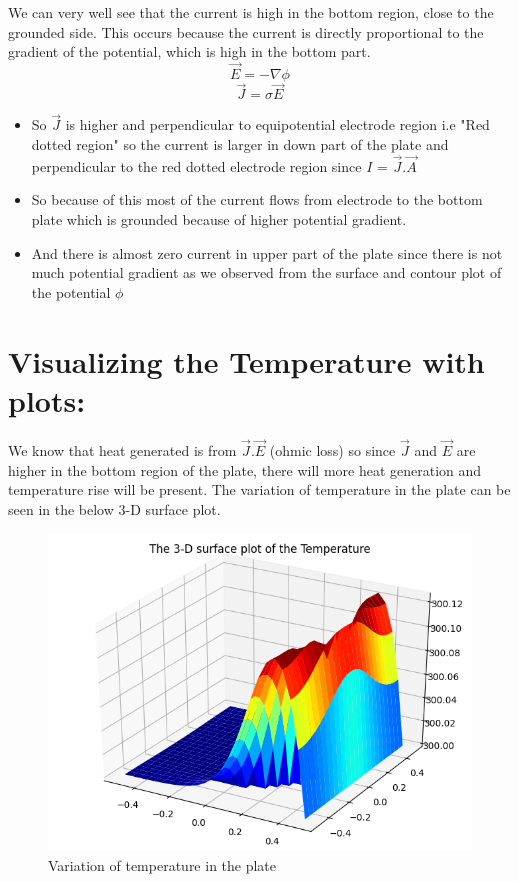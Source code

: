 \documentclass{article}
\begin{document}
We can very well see that the current is high in the bottom region, close to the grounded side.
This occurs because the current is directly proportional to the gradient of the potential, which is high in the bottom part.
  \begin{equation}
  \vec{E} = -\nabla{\phi}
     \end{equation}
  \begin{equation}
  \vec{J} = \sigma\vec{E}
     \end{equation}
  \begin{itemize}
  \item
    So \(\vec{J}\) is higher and perpendicular to equipotential electrode
    region i.e "Red dotted region" so the current is larger in down part
    of the plate and perpendicular to the red dotted electrode region
    since \(I\) = \(\vec{J}.\vec{A}\)
  \item
    So because of this most of the current flows from electrode to the
    bottom plate which is grounded because of higher potential gradient.
  \item
    And there is almost zero current in upper part of the plate since
    there is not much potential gradient as we observed from the surface
    and contour plot of the potential \(\phi\)
  \end{itemize}
  \section{Visualizing the Temperature with plots:}
       We know that heat generated is from \(\vec{J}.\vec{E}\) (ohmic
    loss) so since \(\vec{J}\) and \(\vec{E}\) are higher in the bottom
    region of the plate, there will more heat generation and temperature
    rise will be present.\newline
    The variation of temperature in the plate can be seen in the below 3-D surface plot. 
      \begin{figure}[!tbh]
   \centering
   \includegraphics[scale=0.8]{surface2.png}  
   \caption{Variation of temperature in the plate}
  \end{figure}
\end{document}
